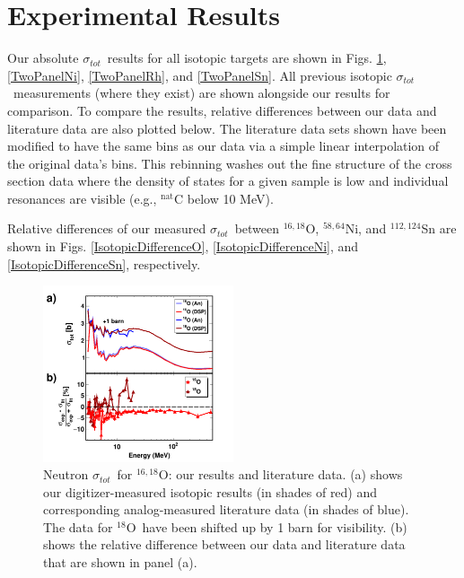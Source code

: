 \documentclass[twocolumn,secnumarabic,amssymb, nobibnotes, aps, prl,
superscriptaddress, nobalancelastpage]{revtex4}
\newcommand{\tot}{\ensuremath{\sigma_{tot}}}
\newcommand{\oEight}{\ensuremath{^{18}}O}
\newcommand{\oSixEight}{\ensuremath{^{16,18}}O}
\begin{document}
\section{Experimental Results}

Our absolute \tot\ results for all isotopic targets are shown in Figs.
\ref{TwoPanelO}, \ref{TwoPanelNi}, \ref{TwoPanelRh}, and \ref{TwoPanelSn}.
All previous
isotopic \tot\ measurements
(where they exist) are shown alongside our results for comparison.
To compare the results, relative differences between our data and literature
data are also plotted below. The literature
data sets shown have been modified to have the same bins as our data via a simple
linear interpolation of the original data's bins. This rebinning
washes out the fine structure of the cross section data where the density of states
for a given sample is low and individual resonances are visible
(e.g., $^{\text{nat}}$C below 10 MeV).

Relative differences of our measured \tot\ between $^{16,18}$O, $^{58,64}$Ni, and
$^{112,124}$Sn are shown in Figs. \ref{IsotopicDifferenceO},
\ref{IsotopicDifferenceNi}, and 
\ref{IsotopicDifferenceSn}, respectively. 
\begin{figure}[tb]
    \centering
    \includegraphics[width=0.5\textwidth]{figures/TwoPanelO.png}
    \caption[Neutron \tot\ for \oSixEight: our results and literature data]
    {Neutron \tot\ for \oSixEight: our results and literature data.
        (a) shows our digitizer-measured isotopic results (in shades of red) and
        corresponding analog-measured literature data \cite{Finlay1993, Perey1972, Vaughn1965,
        Salisbury1965} (in shades of blue). The data for \oEight\ have been
        shifted up by 1 barn for visibility.
        (b) shows the relative difference between our data
        and literature data that are shown in panel (a).
    }
    \label{TwoPanelO}
\end{figure}
\end{document}

